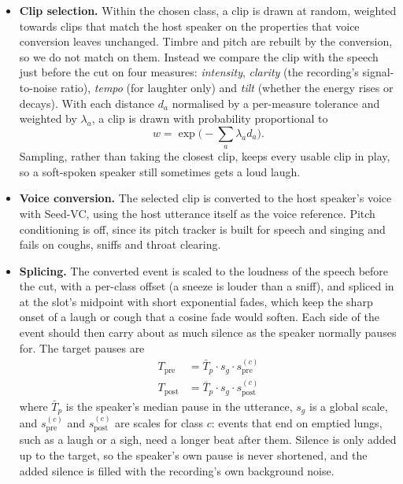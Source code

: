 \documentclass{article} %
\begin{document}
\begin{itemize}
\item \textbf{Clip selection.} Within the chosen class, a clip is drawn at random, weighted towards
clips that match the host speaker on the properties that voice conversion leaves unchanged.
Timbre and pitch are rebuilt by the conversion, so we do not match on them. Instead we compare
the clip with the speech just before the cut on four measures: \emph{intensity},
\emph{clarity} (the recording's signal-to-noise ratio), \emph{tempo} (for laughter only) and
\emph{tilt} (whether the energy rises or decays). With each distance $d_a$ normalised by a
per-measure tolerance and weighted by $\lambda_a$, a clip is drawn with probability
proportional to
\begin{equation}
w = \exp\Big(-\sum_a \lambda_a d_a\Big).
\end{equation}
Sampling, rather than taking the closest clip, keeps every usable clip in play, so a
soft-spoken speaker still sometimes gets a loud laugh.

\item \textbf{Voice conversion.} The selected clip is converted to the host speaker's voice with
Seed-VC, using the host utterance itself as the voice reference. Pitch conditioning is off,
since its pitch tracker is built for speech and singing and fails on coughs, sniffs and throat
clearing.

\item \textbf{Splicing.} The converted event is scaled to the loudness of the speech before the
cut, with a per-class offset (a sneeze is louder than a sniff), and spliced in at the slot's
midpoint with short exponential fades, which keep the sharp onset of a laugh or cough that a
cosine fade would soften. Each side of the event should then carry about as much silence as
the speaker normally pauses for. The target pauses are
\begin{equation}
\begin{aligned}
T_{\mathrm{pre}} &= \bar{T}_{p}\cdot s_g\cdot s_{\mathrm{pre}}^{(c)}\\
T_{\mathrm{post}} &= \bar{T}_{p}\cdot s_g\cdot s_{\mathrm{post}}^{(c)}
\end{aligned}
\end{equation}
where $\bar{T}_{p}$ is the speaker's median pause in the utterance, $s_g$ is a global scale,
and $s_{\mathrm{pre}}^{(c)}$ and $s_{\mathrm{post}}^{(c)}$ are scales for class $c$: events
that end on emptied lungs, such as a laugh or a sigh, need a longer beat after them. Silence is
only added up to the target, so the speaker's own pause is never shortened, and the added
silence is filled with the recording's own background noise.


\end{itemize}
\end{document}
